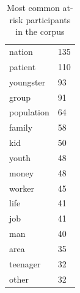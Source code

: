 \begin{table}[htb!]
{\begin{minipage}{.37\textwidth}
\begin{tabularx}{1.0\textwidth}{Xl}
    nation     & 135   \\ 
    patient    & 110   \\ 
    youngster  & 93    \\ 
    group      & 91    \\ 
    population & 64    \\ 
    family     & 58    \\ 
    kid        & 50    \\ 
    youth      & 48    \\ 
    money      & 48    \\ 
    worker     & 45    \\ 
    life       & 41    \\ 
    job        & 41    \\ 
    man        & 40    \\ 
    area       & 35    \\ 
    teenager   & 32    \\ 
    other & 32 \\ \bottomrule
    \end{tabularx}
    \caption{Most common at-risk participants in the corpus}
    \label{tab:atrisk}
    \end{minipage}}%
    \end{table}

